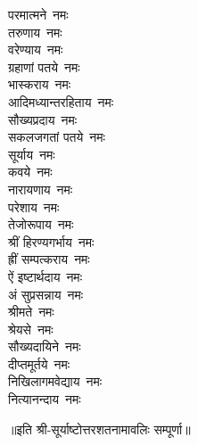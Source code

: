 \begin{multicols}{2}
\begin{flushleft}
परमात्मने~नमः\\
तरुणाय~नमः\\
वरेण्याय~नमः\\
ग्रहाणां पतये~नमः\\
भास्कराय~नमः\hfill{}\\
आदिमध्यान्तरहिताय~नमः\\
सौख्यप्रदाय~नमः\\
सकलजगतां पतये~नमः\\
सूर्याय~नमः\\
कवये~नमः\\
नारायणाय~नमः\\
परेशाय~नमः\\
तेजोरूपाय~नमः\\
श्रीं हिरण्यगर्भाय~नमः\\
ह्रीं सम्पत्कराय~नमः\hfill{}\\
ऐं इष्टार्थदाय~नमः\\
अं सुप्रसन्नाय~नमः\\
श्रीमते~नमः\\
श्रेयसे~नमः\\
सौख्यदायिने~नमः\\
दीप्तमूर्तये~नमः\\
निखिलागमवेद्याय~नमः\\
नित्यानन्दाय~नमः\hfill{}\\
    \end{flushleft}
\end{multicols}
॥इति श्री-सूर्याष्टोत्तरशतनामावलिः सम्पूर्णा॥
